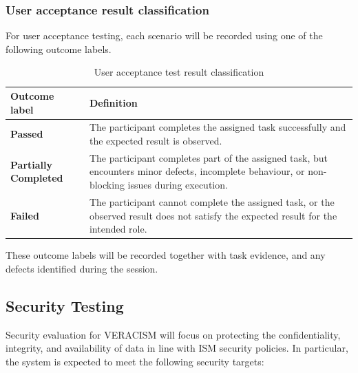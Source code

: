 \subsubsection{User acceptance result classification}

For user acceptance testing, each scenario will be recorded using one of the
following outcome labels.

\begin{table}[H]
  \centering
  \smalltable
  \footnotesize
  {%
  \setlength{\tabcolsep}{6pt}
  \renewcommand{\arraystretch}{1.3}
  \begin{tabular}{|>{\raggedright\arraybackslash}p{}|
                  >{\raggedright\arraybackslash}p{}|}
    \hline
    \textbf{Outcome label} & \textbf{Definition} \\
    \hline\hline

    \textbf{Passed} &
    The participant completes the assigned task successfully and the expected
    result is observed. \\
    \hline

    \textbf{Partially Completed} &
    The participant completes part of the assigned task, but encounters minor
    defects, incomplete behaviour, or non-blocking issues during execution. \\
    \hline

    \textbf{Failed} &
    The participant cannot complete the assigned task, or the observed result
    does not satisfy the expected result for the intended role. \\
    \hline

  \end{tabular}
  }%
  \captionsetup{type=table}
  \caption{User acceptance test result classification}
  \label{tab:uat-result-classification}
\end{table}

These outcome labels will be recorded together with task
evidence, and any defects identified during the session.

\subsection{Security Testing}

Security evaluation for VERACISM will focus on protecting the
confidentiality, integrity, and availability of data in line with ISM
security policies. In particular, the system is expected to meet the
following security targets:


